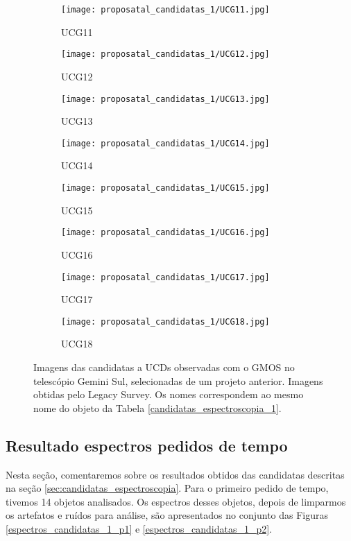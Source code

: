 \begin{figure}[!ht]
\begin{subfigure}[b]{0.22\textwidth}
        \texttt{[image: proposatal\_candidatas\_1/UCG11.jpg]}
        \caption{UCG11}
    \end{subfigure}
    \begin{subfigure}[b]{0.22\textwidth}
        \texttt{[image: proposatal\_candidatas\_1/UCG12.jpg]}
        \caption{UCG12}
    \end{subfigure}
    \begin{subfigure}[b]{0.22\textwidth}
        \texttt{[image: proposatal\_candidatas\_1/UCG13.jpg]}
        \caption{UCG13}
    \end{subfigure}
    \begin{subfigure}[b]{0.22\textwidth}
        \texttt{[image: proposatal\_candidatas\_1/UCG14.jpg]}
        \caption{UCG14}
    \end{subfigure}
    \begin{subfigure}[b]{0.22\textwidth}
        \texttt{[image: proposatal\_candidatas\_1/UCG15.jpg]}
        \caption{UCG15}
    \end{subfigure}
    \begin{subfigure}[b]{0.22\textwidth}
        \texttt{[image: proposatal\_candidatas\_1/UCG16.jpg]}
        \caption{UCG16}
    \end{subfigure}
    \begin{subfigure}[b]{0.22\textwidth}
        \texttt{[image: proposatal\_candidatas\_1/UCG17.jpg]}
        \caption{UCG17}
    \end{subfigure}
    \begin{subfigure}[b]{0.22\textwidth}
        \texttt{[image: proposatal\_candidatas\_1/UCG18.jpg]}
        \caption{UCG18}
    \end{subfigure}
    \caption{Imagens das candidatas a UCDs observadas com o GMOS no telescópio Gemini Sul, selecionadas de um projeto anterior. Imagens obtidas pelo Legacy Survey. Os nomes correspondem ao mesmo nome do objeto da Tabela \ref{candidatas_espectroscopia_1}.}
    \label{candidatas_espectroscopia_1_img}
\end{figure}

\subsection{Resultado espectros pedidos de tempo}\label{subsection:resultado_espectros_candidatas}

Nesta seção, comentaremos sobre os resultados obtidos das candidatas descritas na seção \ref{sec:candidatas_espectroscopia}. Para o primeiro pedido de tempo, tivemos 14 objetos analisados. Os espectros desses objetos, depois de limparmos os artefatos e ruídos para análise, são apresentados no conjunto das Figuras \ref{espectros_candidatas_1_p1} e \ref{espectros_candidatas_1_p2}.

